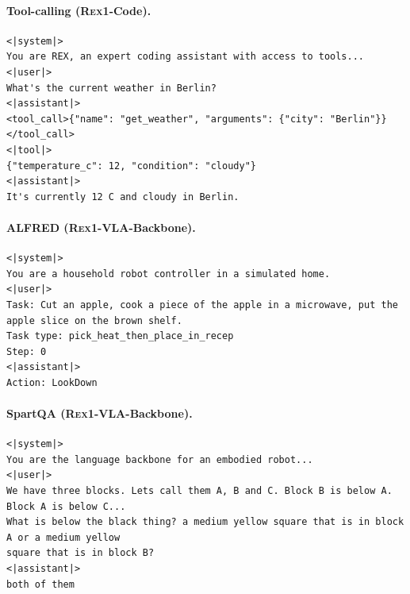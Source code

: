 \documentclass[11pt,a4paper]{article}
\newcommand{\REX}{\textsc{Rex1}\xspace}
\providecommand{\xspace}{}
\begin{document}
\paragraph{Tool-calling (\REX-Code).}
\begin{lstlisting}
<|system|>
You are REX, an expert coding assistant with access to tools...
<|user|>
What's the current weather in Berlin?
<|assistant|>
<tool_call>{"name": "get_weather", "arguments": {"city": "Berlin"}}</tool_call>
<|tool|>
{"temperature_c": 12, "condition": "cloudy"}
<|assistant|>
It's currently 12 C and cloudy in Berlin.
\end{lstlisting}

\paragraph{ALFRED (\REX-VLA-Backbone).}
\begin{lstlisting}
<|system|>
You are a household robot controller in a simulated home.
<|user|>
Task: Cut an apple, cook a piece of the apple in a microwave, put the apple slice on the brown shelf.
Task type: pick_heat_then_place_in_recep
Step: 0
<|assistant|>
Action: LookDown
\end{lstlisting}

\paragraph{SpartQA (\REX-VLA-Backbone).}
\begin{lstlisting}
<|system|>
You are the language backbone for an embodied robot...
<|user|>
We have three blocks. Lets call them A, B and C. Block B is below A. Block A is below C...
What is below the black thing? a medium yellow square that is in block A or a medium yellow
square that is in block B?
<|assistant|>
both of them
\end{lstlisting}
\end{document}
